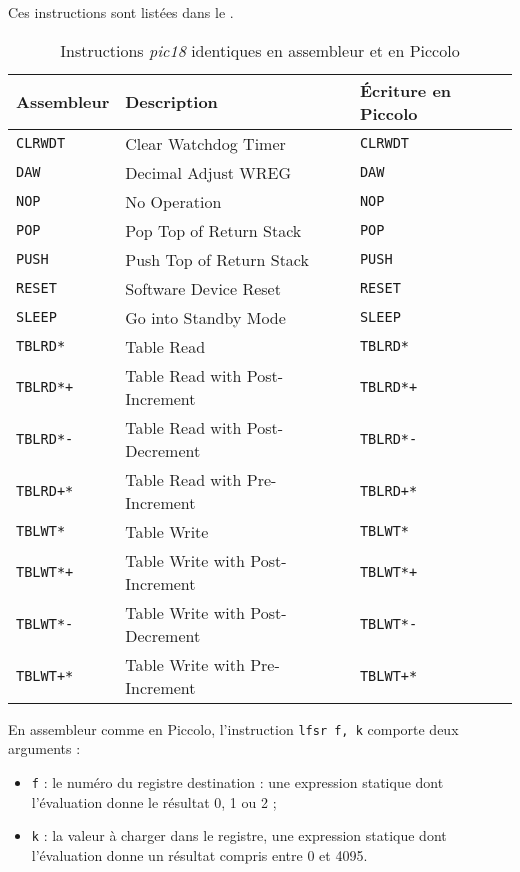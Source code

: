 Ces instructions sont listées dans le .

\begin{table}[!ht]
  \centering
  \small
  \begin{tabular}{lll}
    \textbf{Assembleur} & \textbf{Description} & \textbf{Écriture en Piccolo}\\
    \hline
    \texttt{CLRWDT} & Clear Watchdog Timer & \texttt{CLRWDT}\\
    \texttt{DAW} & Decimal Adjust WREG & \texttt{DAW}\\
    \texttt{NOP} & No Operation & \texttt{NOP}\\
    \texttt{POP} & Pop Top of Return Stack & \texttt{POP} \\
    \texttt{PUSH} & Push Top of Return Stack & \texttt{PUSH}\\
    \texttt{RESET} & Software Device Reset & \texttt{RESET} \\
    \texttt{SLEEP} & Go into Standby Mode & \texttt{SLEEP}\\
    \texttt{TBLRD*} & Table Read & \texttt{TBLRD*} \\
    \texttt{TBLRD*+} & Table Read with Post-Increment & \texttt{TBLRD*+} \\
    \texttt{TBLRD*-} & Table Read with Post-Decrement & \texttt{TBLRD*-} \\
    \texttt{TBLRD+*} & Table Read with Pre-Increment & \texttt{TBLRD+*} \\
    \texttt{TBLWT*} & Table Write & \texttt{TBLWT*} \\
    \texttt{TBLWT*+} & Table Write with Post-Increment & \texttt{TBLWT*+} \\
    \texttt{TBLWT*-} & Table Write with Post-Decrement & \texttt{TBLWT*-} \\
    \texttt{TBLWT+*} & Table Write with Pre-Increment & \texttt{TBLWT+*} \\
    \hline
  \end{tabular}
  \caption{Instructions \emph{pic18} identiques en assembleur et en Piccolo}
\end{table}



En assembleur comme en Piccolo, l'instruction \texttt{lfsr f, k} comporte deux arguments :
\begin{itemize}
  \item \texttt{f} : le numéro du registre destination : une expression statique dont l’évaluation donne le résultat 0, 1 ou 2 ;
  \item \texttt{k} : la valeur à charger dans le registre, une expression statique dont l’évaluation donne un résultat compris entre 0 et 4095.
\end{itemize}

